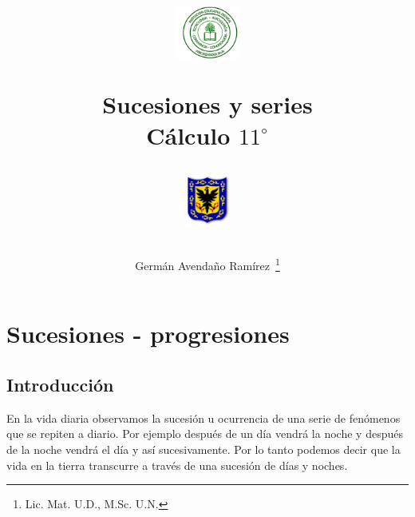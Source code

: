 \documentclass[twoside]{article}
\author{Germ\'an Avenda\~no Ram\'irez~\thanks{Lic. Mat. U.D., M.Sc. U.N.}}
\title{\begin{minipage}{0.15\textwidth}\includegraphics[height=1.75cm]{Images/logo-colegio.png}
\end{minipage}\hfill \begin{minipage}{0.7\textwidth}\begin{center}
Sucesiones y series\\C\'{a}lculo  $11^{\circ}$\end{center}
\end{minipage}\hfill
\begin{minipage}{0.15\textwidth}
 \includegraphics[height=1.75cm]{Images/logo-sed.png} 
\end{minipage}}
\date{}
\begin{document}
\maketitle
\section*{Sucesiones - progresiones}
\subsection*{Introducci\'{o}n}
En la vida diaria observamos la sucesión u ocurrencia de una serie de fenómenos que se repiten a diario. Por ejemplo después de un día vendrá la noche y después de la noche vendrá el día y así sucesivamente. Por lo tanto podemos decir que la vida en la tierra transcurre a través de una sucesión de días y noches.\\
\end{document}
